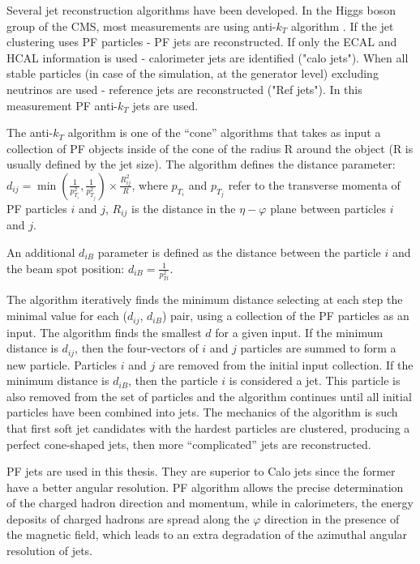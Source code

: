 \begin{small}
Several jet reconstruction algorithms have been developed. In the Higgs boson group of the CMS, most measurements are using anti-$k_T$ algorithm \cite{antiKt}. If the jet clustering uses PF particles - PF jets are reconstructed. If only the ECAL and HCAL information is used - calorimeter jets are identified ("calo jets"). When all stable particles (in case of the simulation, at the generator level) excluding neutrinos are used - reference jets are reconstructed ("Ref jets"). In this measurement PF anti-$k_T$ jets are used. 

The anti-$k_T$ algorithm is one of the ``cone'' algorithms that takes as input a collection of PF objects inside of the cone of the radius R around the object (R is usually defined by the jet size). The algorithm defines the distance parameter:
$d_{ij} = \min (\frac{1}{p^2_{T_i}}, \frac{1}{p^2_{T_j}}) \times \frac{R^2_{ij}}{R}$, where $p_{T_i}$ and $p_{T_j}$ refer to the transverse momenta of PF particles $i$ and $j$, $R_{ij}$ is the distance in the $\eta - \varphi$ plane between particles $i$ and $j$. 

An additional $d_{iB}$ parameter is defined as the distance between the particle $i$ and the beam spot position: $d_{iB} = \frac{1}{p^2_{Ti} }$.

The algorithm iteratively finds the minimum distance selecting at each step the minimal value for each ($d_{ij}$, $d_{iB}$) pair, using a collection of the PF particles as an input. The algorithm finds the smallest $d$ for a given input. If the minimum distance is $d_{ij}$, then the four-vectors of $i$ and $j$ particles are summed to form a new particle. Particles $i$ and $j$ are removed from the initial input collection. If the minimum distance is $d_{iB}$, then the particle $i$ is considered a jet. This particle is also removed from the set of particles and the algorithm continues until all initial particles have been combined into jets. The mechanics of the algorithm is such that first soft jet candidates with the hardest particles are clustered, producing a perfect cone-shaped jets, then more ``complicated'' jets are reconstructed.

PF jets are used in this thesis. They are superior to Calo jets since the former have a better angular resolution. PF algorithm allows the precise determination of the charged hadron direction and momentum, while in calorimeters, the energy deposits of charged hadrons are spread along the $\varphi$ direction in the presence of the magnetic field, which leads to an extra degradation of the azimuthal angular resolution of jets.


\end{small}
